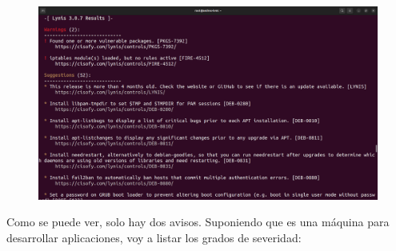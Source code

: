 \documentclass{article}
\begin{document}
\begin{figure}[H]
    \includegraphics[width=\textwidth]{imagenes/lyniswarnings1.png}
\end{figure}

Como se puede ver, solo hay dos avisos. Suponiendo que es una máquina para desarrollar aplicaciones, voy a listar los grados de severidad:
\end{document}
